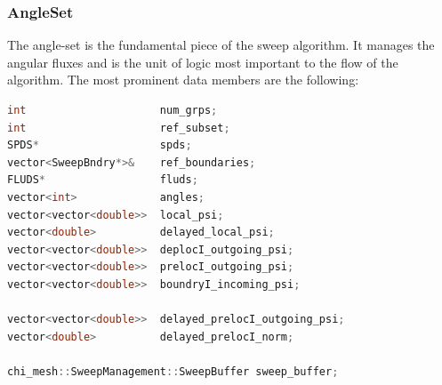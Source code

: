 \documentclass[11pt,letterpaper,titlepage]{article}
\numberwithin{equation}{section}
\begin{document}
\vspace{0.25in}
\subsubsection{AngleSet}
The angle-set is the fundamental piece of the sweep algorithm. It manages the angular fluxes and is the unit of logic most important to the flow of the algorithm. The most prominent data members are the following:

\begin{lstlisting}[language=c++]
int                     num_grps;
int                     ref_subset;
SPDS*                   spds;
vector<SweepBndry*>&    ref_boundaries;
FLUDS*                  fluds;
vector<int>             angles;
vector<vector<double>>  local_psi;
vector<double>          delayed_local_psi;
vector<vector<double>>  deplocI_outgoing_psi;
vector<vector<double>>  prelocI_outgoing_psi;
vector<vector<double>>  boundryI_incoming_psi;

vector<vector<double>>  delayed_prelocI_outgoing_psi;
vector<double>          delayed_prelocI_norm;

chi_mesh::SweepManagement::SweepBuffer sweep_buffer;
\end{lstlisting}
\end{document}
